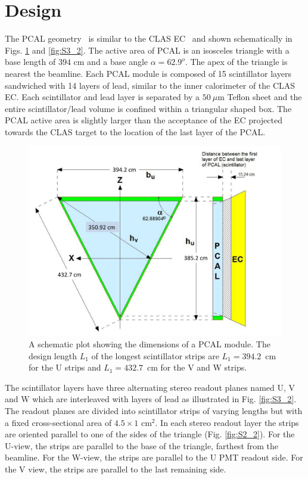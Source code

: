 \section{Design}

The PCAL geometry~\cite{2015002} is similar to the CLAS EC~\cite{clas6nim} and shown schematically in Figs. \ref{fig:S3_1} and \ref{fig:S3_2}.   The active area of PCAL is an isosceles triangle with a base length of $394$ cm and a base angle $\alpha=62.9^o$. The apex of the triangle is nearest the beamline. Each PCAL module is composed of 15 scintillator layers sandwiched with 14 layers of lead, similar to the inner calorimeter of the CLAS EC.  Each scintillator and lead layer is separated by a $50~\mu$m Teflon sheet and the entire scintillator/lead volume is confined within a triangular shaped box. The PCAL active area is slightly larger than the acceptance of the EC projected towards the CLAS target to the location of the last layer of the PCAL. 

\begin{figure}[hbt]
\centering
\includegraphics[width=1.0\columnwidth,keepaspectratio]{img/S3_1.pdf}
\caption[A schematic plot of PCAL]{A schematic plot showing the dimensions of a PCAL module. The design length $L_1$ of the longest scintillator strips are $L_1=394.2$~cm for the U strips and $L_1=432.7$~cm for the V and W strips. }
\label{fig:S3_1}
\end{figure}

The scintillator layers have three alternating stereo readout planes named U, V and W which are interleaved with layers of lead as illustrated in Fig. \ref{fig:S3_2}. The readout planes are divided into scintillator strips of varying lengths but with a fixed cross-sectional area of $4.5 \times 1$ cm$^2$. In each stereo readout layer the strips are oriented parallel to one of the sides of the triangle (Fig. \ref{fig:S2_2}). For the U-view, the strips are parallel to the base of the triangle, farthest from the beamline. For the W-view, the strips are parallel to the U PMT readout side.  For the V view, the strips are parallel to the last remaining side.  

